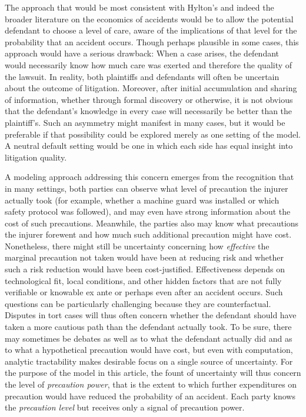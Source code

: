 \documentclass{article}
\begin{document}
The approach that would be most consistent with Hylton's and indeed the broader literature on the economics of accidents would be to allow the potential defendant to choose a level of care, aware of the implications of that level for the probability that an accident occurs. Though perhaps plausible in some cases, this approach would have a serious drawback: When a case arises, the defendant would necessarily know how much care was exerted and therefore the quality of the lawsuit. In reality, both plaintiffs and defendants will often be uncertain about the outcome of litigation. Moreover, after initial accumulation and sharing of information, whether through formal discovery or otherwise, it is not obvious that the defendant's knowledge in every case will necessarily be better than the plaintiff's. Such an asymmetry might manifest in many cases, but it would be preferable if that possibility could be explored merely as one setting of the model. A neutral default setting would be one in which each side has equal insight into litigation quality. 

A modeling approach addressing this concern emerges from the recognition that in many settings, both parties can observe what level of precaution the injurer actually took (for example, whether a machine guard was installed or which safety protocol was followed), and may even have strong information about the cost of such precautions. Meanwhile, the parties also may know what precautions the injurer forewent and how much such additional precaution might have cost. Nonetheless, there might still be uncertainty concerning how \emph{effective} the marginal precaution not taken would have been at reducing risk and whether such a risk reduction would have been cost-justified. Effectiveness depends on technological fit, local conditions, and other hidden factors that are not fully verifiable or knowable ex ante or perhaps even after an accident occurs. Such questions can be particularly challenging because they are counterfactual. Disputes in tort cases will thus often concern whether the defendant should have taken a more cautious path than the defendant actually took. To be sure, there may sometimes be debates as well as to what the defendant actually did and as to what a hypothetical precaution would have cost, but even with computation, analytic tractability makes desirable focus on a single source of uncertainty. For the purpose of the model in this article, the fount of uncertainty will thus concern the level of \emph{precaution power}, that is the extent to which further expenditures on precaution would have reduced the probability of an accident. Each party knows the \emph{precaution level} but receives only a signal of precaution power. 
\end{document}

